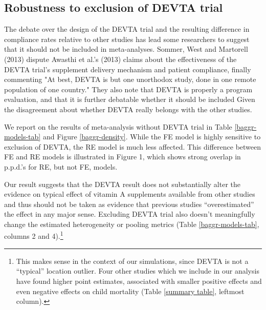 \documentclass[12pt]{article}
\begin{document}
\subsection{Robustness to exclusion of DEVTA trial}

The debate over the design of the DEVTA trial and the resulting difference in compliance rates relative to other studies has lead some researchers to suggest that it should not be included in meta-analyses. Sommer, West and Martorell (2013) dispute Awasthi et al.'s (2013) claims about the effectiveness of the DEVTA trial's supplement delivery mechanism and patient compliance, finally commenting "At best, DEVTA is but one unorthodox study, done in one remote population of one country." 
They also note that DEVTA is properly a program evaluation, and that it is further debatable whether it should be included Given the disagreement about whether DEVTA really belongs with the other studies. 

We report on the results of meta-analysis without DEVTA trial in Table \ref{baggr-models-tab} and Figure \ref{baggr-density}. While the FE model is highly sensitive to exclusion of DEVTA, the RE model is much less affected. This difference between FE and RE models is illustrated in Figure 1, which shows strong overlap in p.p.d.'s for RE, but not FE, models.

Our result suggests that the DEVTA result does not substantially alter the evidence on typical effect of vitamin A supplements available from other studies and thus should not be taken as evidence that previous studies ``overestimated'' the effect in any major sense. Excluding DEVTA trial also doesn't meaningfully change the estimated heterogeneity or pooling metrics (Table \ref{baggr-models-tab}, columns 2 and 4).\footnote{This makes sense in the context of our simulations, since DEVTA is not a ``typical'' location outlier. Four other studies which we include in our analysis have found higher point estimates, associated with smaller positive effects and even negative effects on child mortality (Table \ref{summary table}, leftmost column).}

\end{document}
